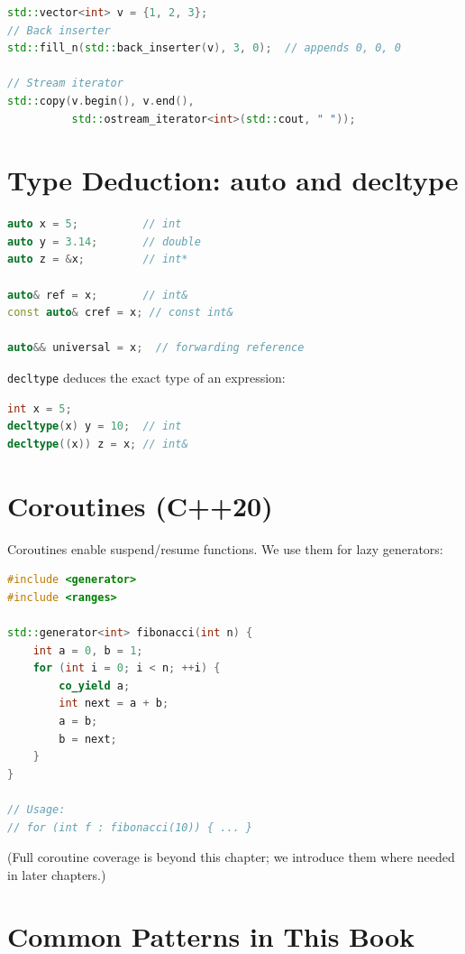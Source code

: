 \begin{lstlisting}[language=C++]
std::vector<int> v = {1, 2, 3};
// Back inserter
std::fill_n(std::back_inserter(v), 3, 0);  // appends 0, 0, 0

// Stream iterator
std::copy(v.begin(), v.end(),
          std::ostream_iterator<int>(std::cout, " "));
\end{lstlisting}

\section{Type Deduction: auto and decltype}

\begin{lstlisting}[language=C++]
auto x = 5;          // int
auto y = 3.14;       // double
auto z = &x;         // int*

auto& ref = x;       // int&
const auto& cref = x; // const int&

auto&& universal = x;  // forwarding reference
\end{lstlisting}

\texttt{decltype} deduces the exact type of an expression:

\begin{lstlisting}[language=C++]
int x = 5;
decltype(x) y = 10;  // int
decltype((x)) z = x; // int&
\end{lstlisting}

\section{Coroutines (C++20)}

Coroutines enable suspend/resume functions. We use them for lazy generators:

\begin{lstlisting}[language=C++]
#include <generator>
#include <ranges>

std::generator<int> fibonacci(int n) {
    int a = 0, b = 1;
    for (int i = 0; i < n; ++i) {
        co_yield a;
        int next = a + b;
        a = b;
        b = next;
    }
}

// Usage:
// for (int f : fibonacci(10)) { ... }
\end{lstlisting}

(Full coroutine coverage is beyond this chapter; we introduce them where needed in later chapters.)

\section{Common Patterns in This Book}

